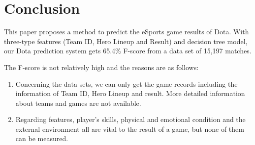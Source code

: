 \section{Conclusion}
This paper proposes a method to predict the eSports game results of Dota.
With three-type features (Team ID, Hero Lineup and Result) and decision tree model, our Dota prediction system gets 65.4\% F-score from a data set of 15,197 matches.
 
The F-score is not relatively high and the reasons are as follows:
\begin{enumerate}
\item Concerning the data sets, we can only get the game records including the information of Team ID, Hero Lineup and result.
More detailed information about teams and games are not available.

\item Regarding features, player’s skills, physical and emotional condition and the external environment all are vital to the result of a game, but none of them can be measured.

\end{enumerate}

